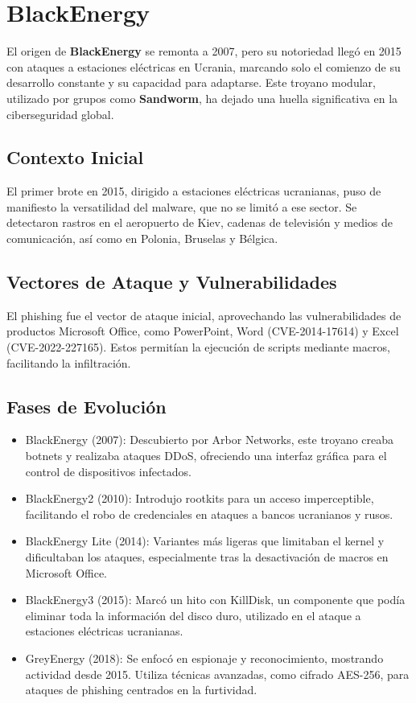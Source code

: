 \section{BlackEnergy} \label{section: BlackEnergy}

El origen de \textbf{BlackEnergy} se remonta a 2007, pero su notoriedad llegó en 2015 con ataques a estaciones eléctricas en Ucrania, marcando solo el comienzo de su desarrollo constante y su capacidad para adaptarse. Este troyano modular, utilizado por grupos como \textbf{Sandworm}, ha dejado una huella significativa en la ciberseguridad global.
\subsection{Contexto Inicial}
El primer brote en 2015, dirigido a estaciones eléctricas ucranianas, puso de manifiesto la versatilidad del malware, que no se limitó a ese sector. Se detectaron rastros en el aeropuerto de Kiev, cadenas de televisión y medios de comunicación, así como en Polonia, Bruselas y Bélgica.
\subsection{Vectores de Ataque y Vulnerabilidades}
El phishing fue el vector de ataque inicial, aprovechando las vulnerabilidades de productos Microsoft Office, como PowerPoint, Word (CVE-2014-17614) y Excel (CVE-2022-227165). Estos permitían la ejecución de scripts mediante macros, facilitando la infiltración.
\subsection{Fases de Evolución}
\begin{itemize}
    \item BlackEnergy (2007): Descubierto por Arbor Networks, este troyano creaba botnets y realizaba ataques DDoS, ofreciendo una interfaz gráfica para el control de dispositivos infectados.
    \item BlackEnergy2 (2010): Introdujo rootkits para un acceso imperceptible, facilitando el robo de credenciales en ataques a bancos ucranianos y rusos.
    \item BlackEnergy Lite (2014): Variantes más ligeras que limitaban el kernel y dificultaban los ataques, especialmente tras la desactivación de macros en Microsoft Office.
    \item BlackEnergy3 (2015): Marcó un hito con KillDisk, un componente que podía eliminar toda la información del disco duro, utilizado en el ataque a estaciones eléctricas ucranianas.
    \item GreyEnergy (2018): Se enfocó en espionaje y reconocimiento, mostrando actividad desde 2015. Utiliza técnicas avanzadas, como cifrado AES-256, para ataques de phishing centrados en la furtividad.
\end{itemize}
